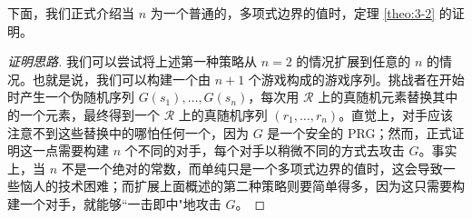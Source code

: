 下面，我们正式介绍当 $n$ 为一个普通的，多项式边界的值时，定理 \ref{theo:3-2} 的证明。

\begin{proof}[证明思路]
我们可以尝试将上述第一种策略从 $n=2$ 的情况扩展到任意的 $n$ 的情况。也就是说，我们可以构建一个由 $n+1$ 个游戏构成的游戏序列。挑战者在开始时产生一个伪随机序列 $G(s_1),\dots,G(s_n)$，每次用 $\mathcal R$ 上的真随机元素替换其中的一个元素，最终得到一个 $\mathcal R$ 上的真随机序列 $(r_1,\dots,r_n)$。直觉上，对手应该注意不到这些替换中的哪怕任何一个，因为 $G$ 是一个安全的 PRG；然而，正式证明这一点需要构建 $n$ 个不同的对手，每个对手以稍微不同的方式去攻击 $G$。事实上，当 $n$ 不是一个绝对的常数，而单纯只是一个多项式边界的值时，这会导致一些恼人的技术困难；而扩展上面概述的第二种策略则要简单得多，因为这只需要构建一个对手，就能够``一击即中"地攻击 $G$。
\end{proof}

